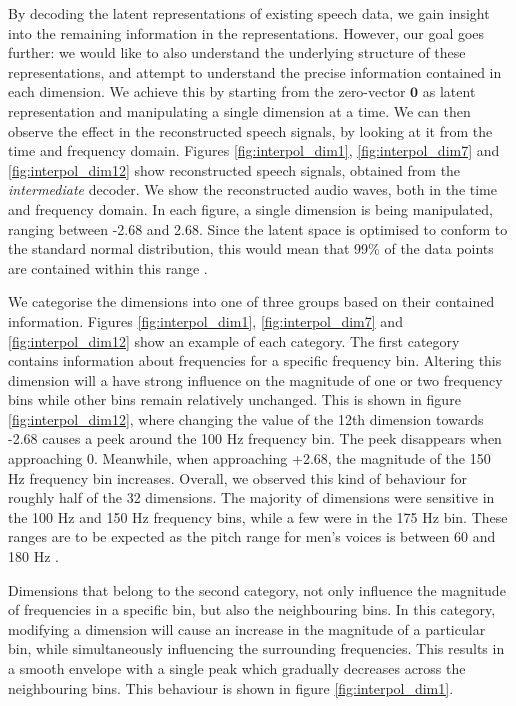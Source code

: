 		
		
		By decoding the latent representations of existing speech data, we gain insight into the remaining information in the representations. However, our goal goes further: we would like to also understand the underlying structure of these representations, and attempt to understand the precise information contained in each dimension. We achieve this by starting from the zero-vector $\textbf{0}$ as latent representation and manipulating a single dimension at a time. We can then observe the effect in the reconstructed speech signals, by looking at it from the time and frequency domain. Figures \ref{fig:interpol_dim1}, \ref{fig:interpol_dim7} and \ref{fig:interpol_dim12} show reconstructed speech signals, obtained from the \textit{intermediate} decoder. We show the reconstructed audio waves, both in the time and frequency domain. In each figure, a single dimension is being manipulated, ranging between -2.68 and 2.68. Since the latent space is optimised to conform to the standard normal distribution, this would mean that 99\% of the data points are contained within this range \citep{bhandariStandardNormalDistribution2020}.
		
		We categorise the dimensions into one of three groups based on their contained information. Figures \ref{fig:interpol_dim1}, \ref{fig:interpol_dim7} and \ref{fig:interpol_dim12} show an example of each category. The first category contains information about frequencies for a specific frequency bin. Altering this dimension will a have strong influence on the magnitude of one or two frequency bins while other bins remain relatively unchanged. This is shown in figure \ref{fig:interpol_dim12}, where changing the value of the 12th dimension towards -2.68 causes a peek around the 100 Hz frequency bin. The peek disappears when approaching 0. Meanwhile, when approaching +2.68, the magnitude of the 150 Hz frequency bin increases. Overall, we observed this kind of behaviour for roughly half of the 32 dimensions. The majority of dimensions were sensitive in the 100 Hz and 150 Hz frequency bins, while a few were in the 175 Hz bin. These ranges are to be expected as the pitch range for men's voices is between 60 and 180 Hz \citep{rePreferencesVeryLow2012}.
		
		Dimensions that belong to the second category, not only influence the magnitude of frequencies in a specific bin, but also the neighbouring bins. In this category, modifying a dimension will cause an increase in the magnitude of a particular bin, while simultaneously influencing the surrounding frequencies. This results in a smooth envelope with a single peak which gradually decreases across the neighbouring bins. This behaviour is shown in figure \ref{fig:interpol_dim1}.
		
